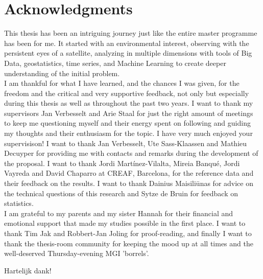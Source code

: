 \section*{Acknowledgments}
This thesis has been an intriguing journey just like the entire master programme has been for me. It started with an environmental interest, observing with the persistent eyes of a satellite, analyzing in multiple dimensions with tools of Big Data, geostatistics, time series, and Machine Learning to create deeper understanding of the initial problem.\\
I am thankful for what I have learned, and the chances I was given, for the freedom and the critical and very supportive feedback, not only but especially during this thesis as well as throughout the past two years. I want to thank my supervisors Jan Verbesselt and Arie Staal for just the right amount of meetings to keep me questioning myself and their energy spent on following and guiding my thoughts and their enthusiasm for the topic. I have very much enjoyed your supervisison! I want to thank Jan Verbesselt, Ute Sass-Klaassen and Mathieu Decuyper for providing me with contacts and remarks during the development of the proposal. I want to thank Jordi Mart\'{i}nez-Vilalta, Mireia Banqué, Jordi Vayreda and David Chaparro at CREAF, Barcelona, for the reference data and their feedback on the results. I want to thank Dainius Maisili\=unas for advice on the technical questions of this research and Sytze de Bruin for feedback on statistics.\\
I am grateful to my parents and my sister Hannah for their financial and emotional support that made my studies possible in the first place. I want to thank Tim Jak and Robbert-Jan Joling for proof-reading, and finally I want to thank the thesis-room community for keeping the mood up at all times and the well-deserved Thursday-evening MGI 'borrels'.\\

\bigskip

Hartelijk dank!